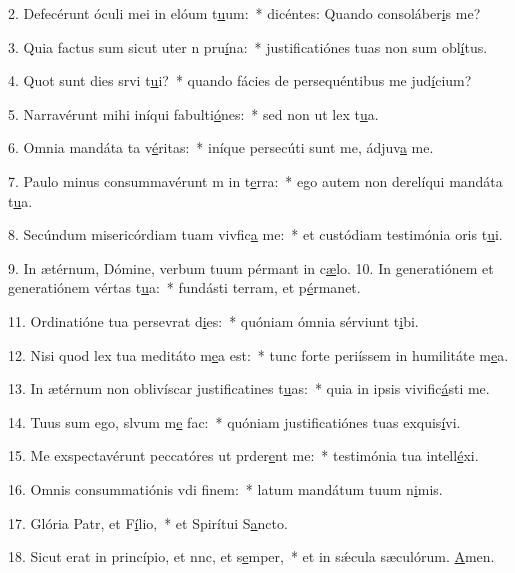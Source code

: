 2. Defecérunt óculi mei in elóum t\uline{u}um:~* dicéntes: Quando consoláber\uline{i}s me?\par 
3. Quia factus sum sicut uter n pru\uline{í}na:~* justificatiónes tuas non sum obl\uline{í}tus.\par 
4. Quot sunt dies srvi t\uline{u}i?~* quando fácies de persequéntibus me jud\uline{í}cium?\par 
5. Narravérunt mihi iníqui fabulti\uline{ó}nes:~* sed non ut lex t\uline{u}a.\par 
6. Omnia mandáta ta v\uline{é}ritas:~* iníque persecúti sunt me, ádjuv\uline{a} me.\par 
7. Paulo minus consummavérunt m in t\uline{e}rra:~* ego autem non derelíqui mandáta t\uline{u}a.\par 
8. Secúndum misericórdiam tuam vivfic\uline{a} me:~* et custódiam testimónia oris t\uline{u}i.\par 
9. In ætérnum, Dómine, verbum tuum pérmant in c\uline{æ}lo.
10. In generatiónem et generatiónem vértas t\uline{u}a:~* fundásti terram, et p\uline{é}rmanet.\par 
11. Ordinatióne tua persevrat d\uline{i}es:~* quóniam ómnia sérviunt t\uline{i}bi.\par 
12. Nisi quod lex tua meditáto m\uline{e}a est:~* tunc forte periíssem in humilitáte m\uline{e}a.\par 
13. In ætérnum non oblivíscar justificatines t\uline{u}as:~* quia in ipsis vivific\uline{á}sti me.\par 
14. Tuus sum ego, slvum m\uline{e} fac:~* quóniam justificatiónes tuas exquis\uline{í}vi.\par 
15. Me exspectavérunt peccatóres ut prder\uline{e}nt me:~* testimónia tua intell\uline{é}xi.\par 
16. Omnis consummatiónis vdi f\uline{i}nem:~* latum mandátum tuum n\uline{i}mis.\par 
17. Glória Patr, et F\uline{í}lio,~* et Spirítui S\uline{a}ncto.\par 
18. Sicut erat in princípio, et nnc, et s\uline{e}mper,~* et in sǽcula sæculórum. \uline{A}men.\par 
